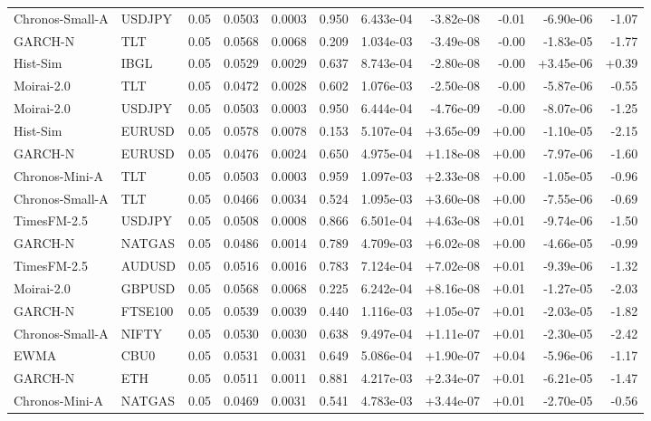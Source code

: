 \begin{tabular}{llrrrrrrrrr}
Chronos-Small-A & USDJPY & 0.05 & 0.0503 & 0.0003 & 0.950 & 6.433e-04 & -3.82e-08 & -0.01 & -6.90e-06 & -1.07 \\
GARCH-N & TLT & 0.05 & 0.0568 & 0.0068 & 0.209 & 1.034e-03 & -3.49e-08 & -0.00 & -1.83e-05 & -1.77 \\
Hist-Sim & IBGL & 0.05 & 0.0529 & 0.0029 & 0.637 & 8.743e-04 & -2.80e-08 & -0.00 & +3.45e-06 & +0.39 \\
Moirai-2.0 & TLT & 0.05 & 0.0472 & 0.0028 & 0.602 & 1.076e-03 & -2.50e-08 & -0.00 & -5.87e-06 & -0.55 \\
Moirai-2.0 & USDJPY & 0.05 & 0.0503 & 0.0003 & 0.950 & 6.444e-04 & -4.76e-09 & -0.00 & -8.07e-06 & -1.25 \\
Hist-Sim & EURUSD & 0.05 & 0.0578 & 0.0078 & 0.153 & 5.107e-04 & +3.65e-09 & +0.00 & -1.10e-05 & -2.15 \\
GARCH-N & EURUSD & 0.05 & 0.0476 & 0.0024 & 0.650 & 4.975e-04 & +1.18e-08 & +0.00 & -7.97e-06 & -1.60 \\
Chronos-Mini-A & TLT & 0.05 & 0.0503 & 0.0003 & 0.959 & 1.097e-03 & +2.33e-08 & +0.00 & -1.05e-05 & -0.96 \\
Chronos-Small-A & TLT & 0.05 & 0.0466 & 0.0034 & 0.524 & 1.095e-03 & +3.60e-08 & +0.00 & -7.55e-06 & -0.69 \\
TimesFM-2.5 & USDJPY & 0.05 & 0.0508 & 0.0008 & 0.866 & 6.501e-04 & +4.63e-08 & +0.01 & -9.74e-06 & -1.50 \\
GARCH-N & NATGAS & 0.05 & 0.0486 & 0.0014 & 0.789 & 4.709e-03 & +6.02e-08 & +0.00 & -4.66e-05 & -0.99 \\
TimesFM-2.5 & AUDUSD & 0.05 & 0.0516 & 0.0016 & 0.783 & 7.124e-04 & +7.02e-08 & +0.01 & -9.39e-06 & -1.32 \\
Moirai-2.0 & GBPUSD & 0.05 & 0.0568 & 0.0068 & 0.225 & 6.242e-04 & +8.16e-08 & +0.01 & -1.27e-05 & -2.03 \\
GARCH-N & FTSE100 & 0.05 & 0.0539 & 0.0039 & 0.440 & 1.116e-03 & +1.05e-07 & +0.01 & -2.03e-05 & -1.82 \\
Chronos-Small-A & NIFTY & 0.05 & 0.0530 & 0.0030 & 0.638 & 9.497e-04 & +1.11e-07 & +0.01 & -2.30e-05 & -2.42 \\
EWMA & CBU0 & 0.05 & 0.0531 & 0.0031 & 0.649 & 5.086e-04 & +1.90e-07 & +0.04 & -5.96e-06 & -1.17 \\
GARCH-N & ETH & 0.05 & 0.0511 & 0.0011 & 0.881 & 4.217e-03 & +2.34e-07 & +0.01 & -6.21e-05 & -1.47 \\
Chronos-Mini-A & NATGAS & 0.05 & 0.0469 & 0.0031 & 0.541 & 4.783e-03 & +3.44e-07 & +0.01 & -2.70e-05 & -0.56 \\

\end{tabular}
